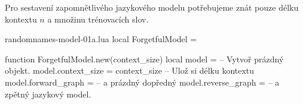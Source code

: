 \documentclass{csbulletin}
\begin{document}
Pro sestavení zapomnětlivého jazykového modelu potřebujeme znát pouze délku kontextu $n$ a množinu trénovacích slov.
\begin{filecontents}{randomnames-model-01a.lua}
local ForgetfulModel = {}

function ForgetfulModel.new(context_size)
  local model = {}                   -- Vytvoř prázdný objekt.
  model.context_size = context_size  -- Ulož si délku kontextu
  model.forward_graph = {}           -- a prázdný dopředný
  model.reverse_graph = {}           -- a zpětný jazykový model.
\end{filecontents}
\begin{filecontents}[overwrite, nosearch, noheader]{randomnames-model-01b.lua}
  local mt = {                       -- Zděď metody\footnotemark
\end{filecontents}
\end{document}
